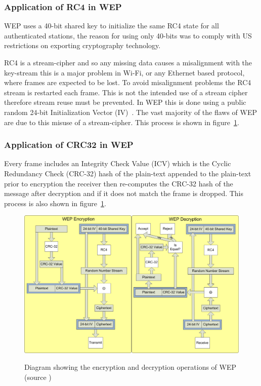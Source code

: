 \documentclass[pdftex, 11pt, a4paper]{article}
\begin{document}
\subsubsection{Application of RC4 in WEP}
WEP uses a 40-bit shared key to initialize the same RC4 state for all authenticated stations, the reason for using only 40-bits was to comply with US restrictions on exporting cryptography technology\cite{wep-evolution}.

RC4 is a stream-cipher and so any missing data causes a misalignment with the key-stream this is a major problem in Wi-Fi, or any Ethernet based protocol, where frames are expected to be lost.
To avoid misalignment problems the RC4 stream is restarted each frame. This is not the intended use of a stream cipher therefore stream reuse must be prevented. In WEP this is done using a public random 24-bit Initialization Vector (IV)~\label{p:iv}.  The vast majority of the flaws of WEP are due to this misuse of a stream-cipher. This process is shown in figure~\ref{fig:wepop}.

\subsubsection{Application of CRC32 in WEP}
Every frame includes an Integrity Check Value (ICV) which is the Cyclic Redundancy Check (CRC-32) hash of the plain-text appended to the plain-text prior to encryption the receiver then re-computes the CRC-32 hash of the message after decryption and if it does not match the frame is dropped. This process is also shown in figure~\ref{fig:wepop}.

\begin{figure}[htb]
\center
\includegraphics[width=0.9\linewidth]{img/wepOperation}\label{fig:wepop}
\caption{Diagram showing the encryption and decryption operations of WEP (source \protect\cite{wep-evolution})}
\end{figure}
\end{document}
